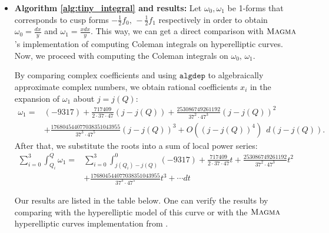\begin{itemize}
\item \textbf{Algorithm \ref{alg:tiny_integral} and results:} Let $\omega_0,\omega_1$ be 1-forms that corresponds to cusp forms $-\frac{1}{2}f_0,\,-\frac{1}{2}f_1$ respectively in order to obtain $\omega_0 = \frac{dx}{y}$ and $\omega_1 = \frac{xdx}{y}$. This way, we can get a direct comparison with $\textsc{Magma}{}$'s implementation of computing Coleman integrals on hyperelliptic curves. Now, we proceed with computing the Coleman integrals on $\omega_0,\,\omega_1$. 




By comparing complex coefficients and using $\texttt{algdep}$ to algebraically approximate complex numbers, we obtain rational coefficients $x_i$ in the expansion of $\omega_1$ about $j=j(Q)$:
\begin{align*} \omega_1  = &(-9317) + \frac{717409}{2 \cdot 37 \cdot 47}(j-j(Q))
                             + \frac{253086749261192}{37^2 \cdot 47^3}(j-j(Q))^2
  \\ &+ \frac{176804544077038351043955}{37^3 \cdot 47^5}(j-j(Q))^3 +
       O((j-j(Q))^4) \ \ d(j-j(Q)). \end{align*}
     After that, we substitute the roots into a sum of local power series: 
\begin{align*}
    \sum_{i=0}^3 \int_{Q_i}^Q \omega_1 = &\sum_{i=0}^3 \int_{j(Q_i)-j(Q)}^{0} (-9317) + \frac{717409}{2 \cdot 37 \cdot 47}t + \frac{253086749261192}{37^2 \cdot 47^3}t^2 \\&+ \frac{176804544077038351043955}{37^3 \cdot 47^5}t^3 +  \cdots  dt 
\end{align*}


Our results are listed in the table below. One can verify the results by comparing with the hyperelliptic model of this curve or with the $\textsc{Magma}{}$ hyperelliptic curves implementation from \cite{balatuit}.
\end{itemize}

